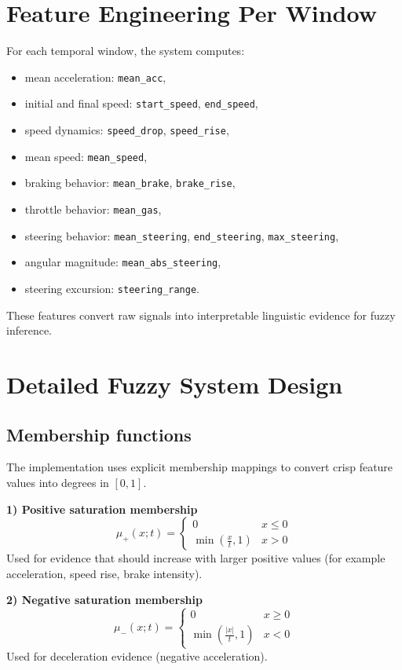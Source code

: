 \documentclass[11pt,a4paper]{article}
\begin{document}
\section{Feature Engineering Per Window}
For each temporal window, the system computes:
\begin{itemize}
    \item mean acceleration: \texttt{mean\_acc},
    \item initial and final speed: \texttt{start\_speed}, \texttt{end\_speed},
    \item speed dynamics: \texttt{speed\_drop}, \texttt{speed\_rise},
    \item mean speed: \texttt{mean\_speed},
    \item braking behavior: \texttt{mean\_brake}, \texttt{brake\_rise},
    \item throttle behavior: \texttt{mean\_gas},
    \item steering behavior: \texttt{mean\_steering}, \texttt{end\_steering}, \texttt{max\_steering},
    \item angular magnitude: \texttt{mean\_abs\_steering},
    \item steering excursion: \texttt{steering\_range}.
\end{itemize}

These features convert raw signals into interpretable linguistic evidence for fuzzy inference.

\section{Detailed Fuzzy System Design}
\subsection{Membership functions}
The implementation uses explicit membership mappings to convert crisp feature values into degrees in $[0,1]$.

\textbf{1) Positive saturation membership}
\[
\mu_{+}(x; t)=
\begin{cases}
0 & x \le 0\\
\min\left(\frac{x}{t},1\right) & x>0
\end{cases}
\]
Used for evidence that should increase with larger positive values (for example acceleration, speed rise, brake intensity).

\textbf{2) Negative saturation membership}
\[
\mu_{-}(x; t)=
\begin{cases}
0 & x \ge 0\\
\min\left(\frac{|x|}{t},1\right) & x<0
\end{cases}
\]
Used for deceleration evidence (negative acceleration).
\end{document}
